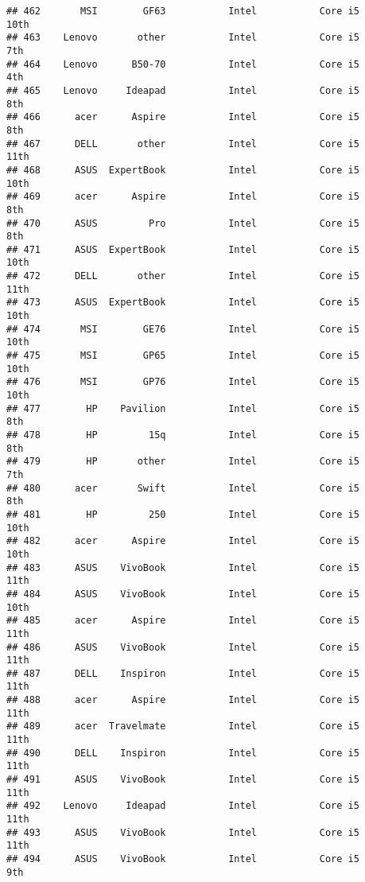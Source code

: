 \documentclass[
]{article}
\begin{document}
\begin{verbatim}
## 462       MSI        GF63           Intel           Core i5            10th
## 463    Lenovo       other           Intel           Core i5             7th
## 464    Lenovo      B50-70           Intel           Core i5             4th
## 465    Lenovo     Ideapad           Intel           Core i5             8th
## 466      acer      Aspire           Intel           Core i5             8th
## 467      DELL       other           Intel           Core i5            11th
## 468      ASUS  ExpertBook           Intel           Core i5            10th
## 469      acer      Aspire           Intel           Core i5             8th
## 470      ASUS         Pro           Intel           Core i5             8th
## 471      ASUS  ExpertBook           Intel           Core i5            10th
## 472      DELL       other           Intel           Core i5            11th
## 473      ASUS  ExpertBook           Intel           Core i5            10th
## 474       MSI        GE76           Intel           Core i5            10th
## 475       MSI        GP65           Intel           Core i5            10th
## 476       MSI        GP76           Intel           Core i5            10th
## 477        HP    Pavilion           Intel           Core i5             8th
## 478        HP         15q           Intel           Core i5             8th
## 479        HP       other           Intel           Core i5             7th
## 480      acer       Swift           Intel           Core i5             8th
## 481        HP         250           Intel           Core i5            10th
## 482      acer      Aspire           Intel           Core i5            10th
## 483      ASUS    VivoBook           Intel           Core i5            11th
## 484      ASUS    VivoBook           Intel           Core i5            10th
## 485      acer      Aspire           Intel           Core i5            11th
## 486      ASUS    VivoBook           Intel           Core i5            11th
## 487      DELL    Inspiron           Intel           Core i5            11th
## 488      acer      Aspire           Intel           Core i5            11th
## 489      acer  Travelmate           Intel           Core i5            11th
## 490      DELL    Inspiron           Intel           Core i5            11th
## 491      ASUS    VivoBook           Intel           Core i5            11th
## 492    Lenovo     Ideapad           Intel           Core i5            11th
## 493      ASUS    VivoBook           Intel           Core i5            11th
## 494      ASUS    VivoBook           Intel           Core i5             9th

\end{verbatim}
\end{document}
